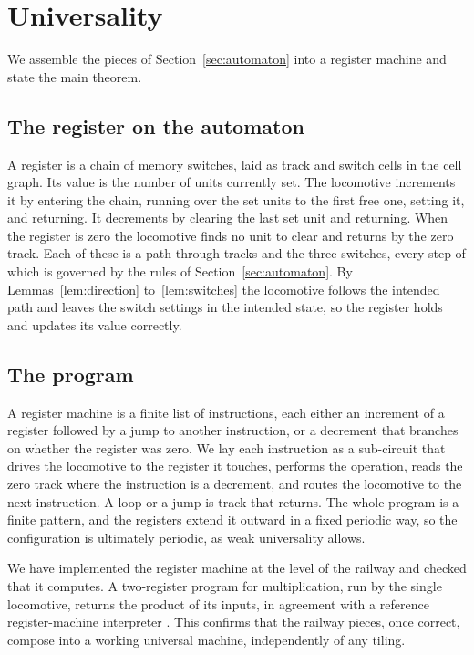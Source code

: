 \section{Universality}
\label{sec:universality}

We assemble the pieces of Section~\ref{sec:automaton} into a register machine and state the main theorem.

\subsection{The register on the automaton}

A register is a chain of memory switches, laid as track and switch cells in the cell graph. Its value is the
number of units currently set. The locomotive increments it by entering the chain, running over the set units
to the first free one, setting it, and returning. It decrements by clearing the last set unit and returning.
When the register is zero the locomotive finds no unit to clear and returns by the zero track. Each of these is
a path through tracks and the three switches, every step of which is governed by the rules of
Section~\ref{sec:automaton}. By Lemmas~\ref{lem:direction} to~\ref{lem:switches} the locomotive follows the
intended path and leaves the switch settings in the intended state, so the register holds and updates its
value correctly.

\subsection{The program}

A register machine is a finite list of instructions, each either an increment of a register followed by a jump
to another instruction, or a decrement that branches on whether the register was zero. We lay each instruction
as a sub-circuit that drives the locomotive to the register it touches, performs the operation, reads the zero
track where the instruction is a decrement, and routes the locomotive to the next instruction. A loop or a jump
is track that returns. The whole program is a finite pattern, and the registers extend it outward in a fixed
periodic way, so the configuration is ultimately periodic, as weak universality allows.

We have implemented the register machine at the level of the railway and checked that it computes. A
two-register program for multiplication, run by the single locomotive, returns the product of its inputs, in
agreement with a reference register-machine interpreter \cite{pollard2026vibe}. This confirms that the railway
pieces, once correct, compose into a working universal machine, independently of any tiling.

